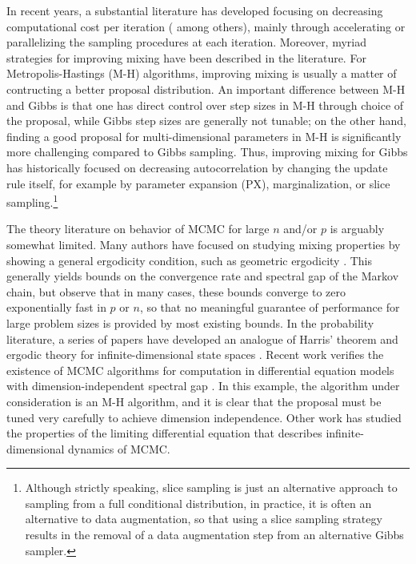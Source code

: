 \documentclass[10pt]{article}
\begin{document}
In recent years, a substantial literature has developed focusing on decreasing computational cost per iteration (\cite{minsker2014robust,srivastava2015wasp,conrad2015accelerating} among others), mainly through accelerating or parallelizing the sampling procedures at each iteration. Moreover, myriad strategies for improving mixing have been described in the literature. For Metropolis-Hastings (M-H) algorithms, improving mixing is usually a matter of contructing a better proposal distribution. An important difference between M-H and Gibbs is that one has direct control over step sizes in M-H through choice of the proposal, while Gibbs step sizes are generally not tunable; on the other hand, finding a good proposal for multi-dimensional parameters in M-H is significantly more challenging compared to Gibbs sampling. Thus, improving mixing for Gibbs has historically focused on decreasing autocorrelation by changing the update rule itself, for example by parameter expansion (PX), marginalization, or slice sampling.\footnote{Although strictly speaking, slice sampling is just an alternative approach to sampling from a full conditional distribution, in practice, it is often an alternative to data augmentation, so that using a slice sampling strategy results in the removal of a data augmentation step from an alternative Gibbs sampler.} 

The theory literature on behavior of MCMC for large $n$ and/or $p$ is arguably somewhat limited. Many authors have focused on studying mixing properties by showing 
a general ergodicity condition, such as geometric ergodicity \citep{meyn2012markov,roberts2004general}. This generally yields bounds on the convergence rate and spectral gap of the Markov chain, but \cite{rajaratnam2015mcmc} observe that in many cases, these bounds converge to zero exponentially fast in $p$ or $n$, so that no meaningful guarantee of performance for large problem sizes is provided by most existing bounds. In the probability literature, a series of papers have developed an analogue of Harris' theorem and ergodic theory for infinite-dimensional state spaces \citep{hairer2011asymptotic}. Recent work verifies the existence of MCMC algorithms for computation in differential equation models with dimension-independent spectral gap \citep{hairer2014spectral}. In this example, the algorithm under consideration is an M-H algorithm, and it is clear that the proposal must be tuned very carefully to achieve dimension independence. Other work has studied the properties of the limiting differential equation that describes infinite-dimensional dynamics of MCMC.
\end{document}
